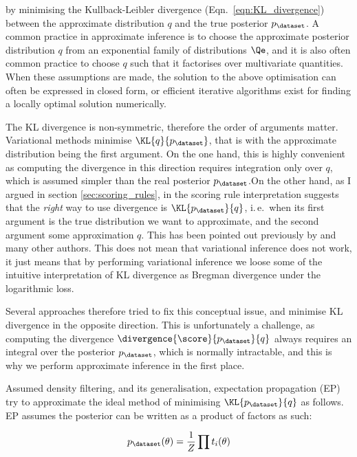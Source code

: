 by minimising the Kullback-Leibler divergence (Eqn.\ \eqref{eqn:KL_divergence}) between the approximate distribution $q$ and the true posterior $p_{\dataset}$. A common practice in approximate inference is to choose the approximate posterior distribution $q$ from an exponential family of distributions $\Qe$, and it is also often common practice to choose $q$ such that it factorises over multivariate quantities. When these assumptions are made, the solution to the above optimisation can often be expressed in closed form, or efficient iterative algorithms exist for finding a locally optimal solution numerically.

The KL divergence is non-symmetric, therefore the order of arguments matter. Variational methods minimise $\KL{q}{p_{\dataset}}$, that is with the approximate distribution being the first argument. On the one hand, this is highly convenient as computing the divergence in this direction requires integration only over $q$, which is assumed simpler than the real posterior $p_{\dataset}$.On the other hand, as I argued in section \ref{sec:scoring_rules}, in the scoring rule interpretation suggests that the \emph{right} way to use divergence is $\KL{p_{\dataset}}{q}$, i.\,e.\ when its first argument is the true distribution we want to approximate, and the second argument some approximation $q$. This has been pointed out previously by \cite{Csato2002,Minka2001} and many other authors. This does not mean that variational inference does not work, it just means that by performing variational inference we loose some of the intuitive interpretation of KL divergence as Bregman divergence under the logarithmic loss.

Several approaches therefore tried to fix this conceptual issue, and minimise KL divergence in the opposite direction. This is unfortunately a challenge, as computing the divergence $\divergence{\score}{p_{\dataset}}{q}$ always requires an integral over the posterior $p_{\dataset}$, which is normally intractable, and this is why we perform approximate inference in the first place.

Assumed density filtering, and its generalisation, expectation propagation (EP) try to approximate the ideal method of minimising $\KL{p_{\dataset}}{q}$ as follows. EP assumes the posterior can be written as a product of factors as such:

\begin{equation}
	p_{\dataset}(\theta) = \frac{1}{Z} \prod t_i(\theta)
\end{equation}


